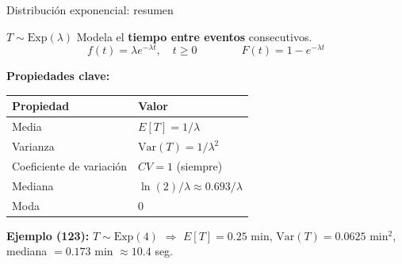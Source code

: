 \documentclass[aspectratio=1610, 9pt]{beamer}
\begin{document}
\begin{frame}{Distribuci\'{o}n exponencial: resumen}

\begin{block}{$T \sim \text{Exp}(\lambda)$}
Modela el \textbf{tiempo entre eventos} consecutivos.
\[
f(t) = \lambda e^{-\lambda t}, \quad t \geq 0 \qquad\qquad F(t) = 1 - e^{-\lambda t}
\]
\end{block}

\vspace{0.2cm}
\textbf{Propiedades clave:}
\renewcommand{\arraystretch}{1.4}
\begin{center}
\begin{tabular}{ll}
\toprule
\textbf{Propiedad} & \textbf{Valor} \\
\midrule
Media & $E[T] = 1/\lambda$ \\
Varianza & $\text{Var}(T) = 1/\lambda^2$ \\
Coeficiente de variaci\'{o}n & $CV = 1$ (siempre) \\
Mediana & $\ln(2)/\lambda \approx 0.693/\lambda$ \\
Moda & $0$ \\
\bottomrule
\end{tabular}
\end{center}

\vspace{0.2cm}
\textbf{Ejemplo (123):} $T \sim \text{Exp}(4)$ $\Rightarrow$ $E[T] = 0.25$ min, $\text{Var}(T) = 0.0625$ min$^2$, mediana $= 0.173$ min $\approx 10.4$ seg.
\end{frame}
\end{document}
